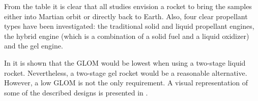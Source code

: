 From the table it is clear that all studies envision a rocket to bring the samples either into Martian orbit or directly back to Earth. Also, four clear propellant types have been investigated: the traditional solid and liquid propellant engines, the hybrid engine (which is a combination of a solid fuel and a liquid oxidizer) and the gel engine. 

%



In \cite{trinidad2012} it is shown that the \ac{GLOM} would be lowest when using a two-stage liquid rocket. Nevertheless, a two-stage gel rocket would be a reasonable alternative. However, a low \ac{GLOM} is not the only requirement. A visual representation of some of the described designs is presented in .


